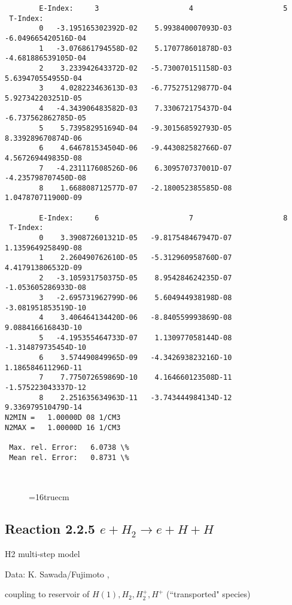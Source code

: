 \documentclass[12pt,dvipdfmx]{article}
\begin{document}
{\begin{small}
\begin{verbatim}
        E-Index:     3                     4                     5
 T-Index:
        0   -3.195165302392D-02    5.993840007093D-03   -6.049665420516D-04
        1   -3.076861794558D-02    5.170778601878D-03   -4.681886539105D-04
        2    3.233942643372D-02   -5.730070151158D-03    5.639470554955D-04
        3    4.028223463613D-03   -6.775275129877D-04    5.927342203251D-05
        4   -4.343906483582D-03    7.330672175437D-04   -6.737562862785D-05
        5    5.739582951694D-04   -9.301568592793D-05    8.339289670874D-06
        6    4.646781534504D-06   -9.443082582766D-07    4.567269449835D-08
        7   -4.231117608526D-06    6.309570737001D-07   -4.235798707450D-08
        8    1.668808712577D-07   -2.180052385585D-08    1.047870711900D-09

        E-Index:     6                     7                     8
 T-Index:
        0    3.390872601321D-05   -9.817548467947D-07    1.135964925849D-08
        1    2.260490762610D-05   -5.312960958760D-07    4.417913806532D-09
        2   -3.105931750375D-05    8.954284624235D-07   -1.053605286933D-08
        3   -2.695731962799D-06    5.604944938198D-08   -3.081951853519D-10
        4    3.406464134420D-06   -8.840559993869D-08    9.088416616843D-10
        5   -4.195355464733D-07    1.130977058144D-08   -1.314879735454D-10
        6    3.574490849965D-09   -4.342693823216D-10    1.186584611296D-11
        7    7.775072659869D-10    4.164660123508D-11   -1.575223043337D-12
        8    2.251635634963D-11   -3.743444984134D-12    9.336979510479D-14
N2MIN =   1.00000D 08 1/CM3
N2MAX =   1.00000D 16 1/CM3

 Max. rel. Error:   6.0738 \%
 Mean rel. Error:   0.8731 \%



\end{verbatim}\end{small}
\begin{figure} \label{2.1.8b}
\epsfxsize=16truecm
\end{figure}
\newpage


\subsection{
Reaction 2.2.5    $e + H_2   \rightarrow e + H + H  $
}

H2 multi-step model

 Data: K. Sawada/Fujimoto ,\cite{kn:Sawada}

coupling to reservoir of $  H(1), H_2, H_2^+, H^+ $ (``transported" species)


}
\end{document}
